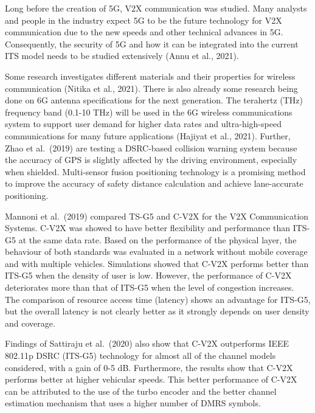 \documentclass[
]{book}
\begin{document}
Long before the creation of 5G, V2X communication was studied. Many analysts and people in the industry expect 5G to be the future technology for V2X communication due to the new speeds and other technical advances in 5G. Consequently, the security of 5G and how it can be integrated into the current ITS model needs to be studied extensively (Annu et al., 2021).

Some research investigates different materials and their properties for wireless communication (Nitika et al., 2021). There is also already some research being done on 6G antenna specifications for the next generation. The terahertz (THz) frequency band (0.1-10 THz) will be used in the 6G wireless communications system to support user demand for higher data rates and ultra-high-speed communications for many future applications (Hajiyat et al., 2021). Further, Zhao et al.~(2019) are testing a DSRC-based collision warning system because the accuracy of GPS is slightly affected by the driving environment, especially when shielded. Multi-sensor fusion positioning technology is a promising method to improve the accuracy of safety distance calculation and achieve lane-accurate positioning.

Mannoni et al.~(2019) compared TS-G5 and C-V2X for the V2X Communication Systems. C-V2X was showed to have better flexibility and performance than ITS-G5 at the same data rate. Based on the performance of the physical layer, the behaviour of both standards was evaluated in a network without mobile coverage and with multiple vehicles. Simulations showed that C-V2X performs better than ITS-G5 when the density of user is low. However, the performance of C-V2X deteriorates more than that of ITS-G5 when the level of congestion increases. The comparison of resource access time (latency) shows an advantage for ITS-G5, but the overall latency is not clearly better as it strongly depends on user density and coverage.

Findings of Sattiraju et al.~(2020) also show that C-V2X outperforms IEEE 802.11p DSRC (ITS-G5) technology for almost all of the channel models considered, with a gain of 0-5 dB. Furthermore, the results show that C-V2X performs better at higher vehicular speeds. This better performance of C-V2X can be attributed to the use of the turbo encoder and the better channel estimation mechanism that uses a higher number of DMRS symbols.
\end{document}
